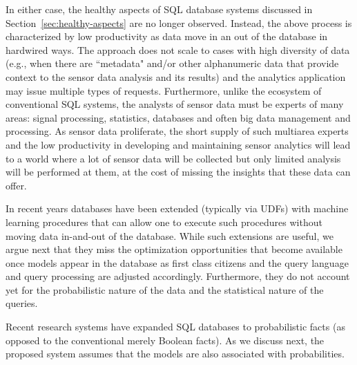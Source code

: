 In either case, the healthy aspects of SQL database systems discussed in Section~\ref{sec:healthy-aspects} are no longer observed. Instead, the above process is characterized by low productivity as data move in an out of the database in hardwired ways. The approach does not scale to cases with high diversity of data (e.g., when there are ``metadata" and/or other alphanumeric data that provide context to the sensor data analysis and its results) and the analytics application may issue multiple types of  requests. Furthermore, unlike the ecosystem of conventional SQL systems, the analysts of sensor data must be experts of many areas: signal processing, statistics, databases and often big data management and processing. As sensor data proliferate, the short supply of such multiarea experts and the low productivity in developing and maintaining sensor analytics will lead to a world where a lot of sensor data will be collected but only limited analysis will be performed at them, at the cost of missing the insights that these data can offer.


In recent years databases have been extended (typically via UDFs) with machine learning procedures that can allow one to execute such procedures without moving data in-and-out of the database. While such extensions are useful, we argue next that they miss the optimization opportunities that become available once models appear in the database as first class citizens and the query language and query processing are adjusted accordingly. Furthermore, they do not account yet for the probabilistic nature of the data and the statistical nature of the queries.

Recent research systems have expanded SQL databases to probabilistic facts (as opposed to the conventional merely Boolean facts). As we discuss next, the proposed system assumes that the models are also associated with probabilities.


